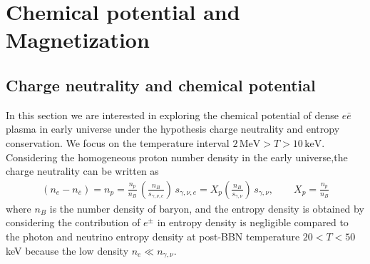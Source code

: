 \documentclass[Universe,article,submit,moreauthors,pdftex]{Definitions/mdpi}
\begin{document}
\section{Chemical potential and Magnetization}
\subsection{Charge neutrality and chemical potential}
 In this section we are interested in exploring the chemical potential of dense $e\bar e$ plasma in early universe under the hypothesis charge neutrality and entropy conservation. We focus on the temperature interval $2\,\mathrm{MeV}>T>10\,\mathrm{keV}$. Considering the homogeneous proton number density in the early universe,the charge neutrality can be written as
\begin{align}
  \label{density_proton}\left(n_{e}-n_{\bar{e}}\right)=n_{p}=\frac{n_{p}}{n_{B}}\,\left(\frac{n_{B}}{s_{\gamma,\nu,e}}\right)\,s_{\gamma,\nu,e}= X_p\left(\frac{n_B}{s_{\gamma,\nu}}\right)\,s_{\gamma,\nu},\qquad X_p=\frac{n_p}{n_B}
\end{align}
where $n_B$ is the number density of baryon, and the entropy density is obtained by considering the contribution of $e^\pm$ in entropy density is negligible compared to the photon and neutrino entropy density at post-BBN temperature $20<T<50$keV because the low density $n_e\ll n_{\gamma,\nu}$. 
\end{document}
